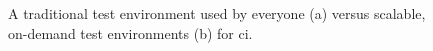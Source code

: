 \documentclass[../main.tex]{subfiles}
\begin{document}
    \begin{figure}[h]
        \centering
        \captionsetup{justification=centering}
        \caption{
            A traditional test environment used by everyone (a) versus scalable, on-demand test environments (b) for \acrlong{ci}.
        }
        \label{fig:tes_env_scaled}
    \end{figure}
\end{document}

